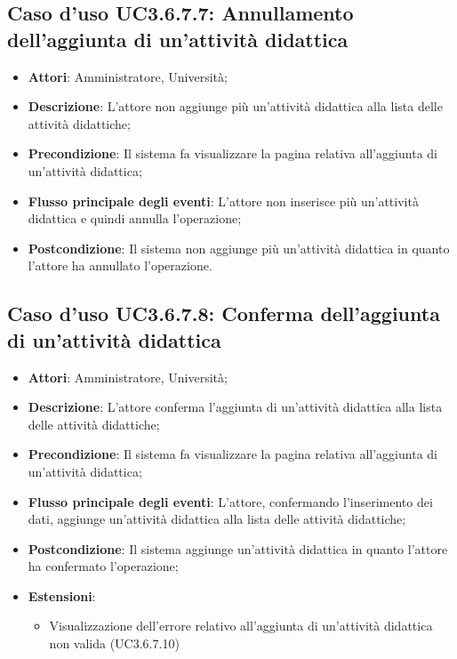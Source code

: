 \subsection{Caso d'uso \texorpdfstring{UC3.6.7.7}{UC3.6.7.7}: Annullamento dell’aggiunta di un’attività didattica}
\begin{itemize}
\item \textbf{Attori}: Amministratore, Università;
\item \textbf{Descrizione}: L'attore non aggiunge più un'attività didattica alla lista delle attività didattiche;

\item \textbf{Precondizione}: Il sistema fa visualizzare la pagina relativa all'aggiunta di un'attività didattica;

\item \textbf{Flusso principale degli eventi}: L'attore non inserisce più un'attività didattica e quindi annulla l'operazione;

\item \textbf{Postcondizione}: Il sistema non aggiunge più un'attività didattica in quanto l'attore ha annullato l'operazione.
\end{itemize}
\subsection{Caso d'uso \texorpdfstring{UC3.6.7.8}{UC3.6.7.8}: Conferma dell’aggiunta di un’attività didattica}
\begin{itemize}
\item \textbf{Attori}: Amministratore, Università;
\item \textbf{Descrizione}: L'attore conferma l'aggiunta di un’attività didattica alla lista delle attività didattiche;

\item \textbf{Precondizione}: Il sistema fa visualizzare la pagina relativa all'aggiunta di un’attività didattica;

\item \textbf{Flusso principale degli eventi}: L'attore, confermando l'inserimento dei dati, aggiunge un’attività didattica alla lista delle attività didattiche;

\item \textbf{Postcondizione}: Il sistema aggiunge un'attività didattica in quanto l'attore ha confermato l'operazione;

\item \textbf{Estensioni}:
\begin{itemize}
\item Visualizzazione dell'errore relativo all’aggiunta di un’attività didattica non valida (UC3.6.7.10)
\end{itemize}
\end{itemize}
